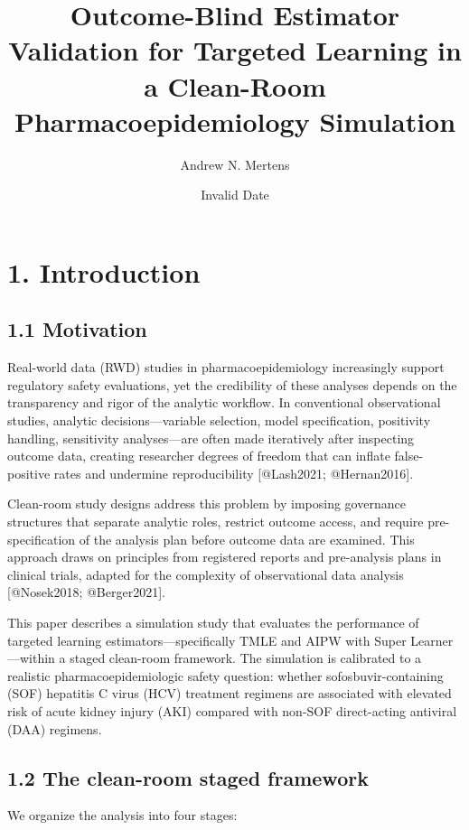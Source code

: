\documentclass[
  letterpaper,
  DIV=11,
  numbers=noendperiod]{scrartcl}
\title{Outcome-Blind Estimator Validation for Targeted Learning in a
Clean-Room Pharmacoepidemiology Simulation}
\author{Andrew N. Mertens}
\date{Invalid Date}
\begin{document}
\maketitle


\section{1. Introduction}\label{introduction}

\subsection{1.1 Motivation}\label{motivation}

Real-world data (RWD) studies in pharmacoepidemiology increasingly
support regulatory safety evaluations, yet the credibility of these
analyses depends on the transparency and rigor of the analytic workflow.
In conventional observational studies, analytic decisions---variable
selection, model specification, positivity handling, sensitivity
analyses---are often made iteratively after inspecting outcome data,
creating researcher degrees of freedom that can inflate false-positive
rates and undermine reproducibility {[}@Lash2021; @Hernan2016{]}.

Clean-room study designs address this problem by imposing governance
structures that separate analytic roles, restrict outcome access, and
require pre-specification of the analysis plan before outcome data are
examined. This approach draws on principles from registered reports and
pre-analysis plans in clinical trials, adapted for the complexity of
observational data analysis {[}@Nosek2018; @Berger2021{]}.

This paper describes a simulation study that evaluates the performance
of targeted learning estimators---specifically TMLE and AIPW with Super
Learner---within a staged clean-room framework. The simulation is
calibrated to a realistic pharmacoepidemiologic safety question: whether
sofosbuvir-containing (SOF) hepatitis C virus (HCV) treatment regimens
are associated with elevated risk of acute kidney injury (AKI) compared
with non-SOF direct-acting antiviral (DAA) regimens.

\subsection{1.2 The clean-room staged
framework}\label{the-clean-room-staged-framework}

We organize the analysis into four stages:
\end{document}
